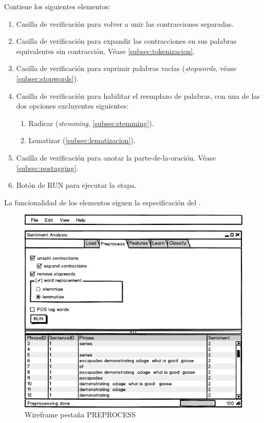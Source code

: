 Contiene los siguientes elementos:
\begin{enumerate}
\item Casilla de verificación para volver a unir las contracciones separadas.
\item Casilla de verificación para expandir las contracciones en sus palabras equivalentes sin contracción. Véase \autoref{subsec:tokenizacion}.
\item Casilla de verificación para suprimir palabras vacías (\emph{stopwords}, véase \autoref{subsec:stopwords}).
\item Casilla de verificación para habilitar el reemplazo de palabras, con una de las dos opciones excluyentes siguientes:
\begin{enumerate}
\item Radicar (\emph{stemming}, \autoref{subsec:stemming}).
\item Lematizar (\autoref{subsec:lematizacion}).
\end{enumerate}
\item Casilla de verificación para anotar la parte-de-la-oración. Véase \autoref{subsec:postagging}.
\item Botón de RUN para ejecutar la etapa.
\end{enumerate}

La funcionalidad de los elementos siguen la especificación del .

\begin{figure}[htbp]
\centering
\includegraphics[width=12cm,clip=true,trim=0 0 0 38pt]{gui-2-preprocess}
\caption{Wireframe pestaña PREPROCESS}
\label{fig:gui-2-preprocess}
\end{figure}

